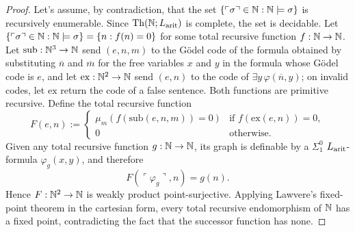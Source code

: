 \begin{proof}
    Let's assume, by contradiction, that the set $\{\ulcorner \sigma \urcorner \in \mathbb{N} : \mathbb{N} \models \sigma\}$ is recursively enumerable. Since $\mathrm{Th}(\mathbb{N};L_{\textnormal{arit}})$ is complete,
    the set is decidable. Let $\{\ulcorner \sigma \urcorner \in \mathbb{N} : \mathbb{N} \models \sigma\} = \{n : f(n) = 0\}$ for some total recursive function $f : \mathbb{N} \to \mathbb{N}$.\newline
    Let $\mathrm{sub} : \mathbb{N}^3 \to \mathbb{N}$ send $(e,n,m)$ to the Gödel code of the formula obtained by substituting $\overline n$ and $\overline m$ for the free variables $x$ and $y$ in the formula whose Gödel code is $e$, and let $\mathrm{ex} : \mathbb{N}^2 \to \mathbb{N}$ send $(e,n)$ to the code of $\exists y\,\varphi(\overline n,y)$; on invalid codes, let $\mathrm{ex}$ return the code of a false sentence. Both functions are primitive recursive.
    Define the total recursive function
    \[ F(e,n) := \begin{cases}\mu_m(f(\mathrm{sub}(e,n,m))=0)&\text{if $f(\mathrm{ex}(e,n))=0$},\\0&\text{otherwise}.\end{cases} \]
    Given any total recursive function $g : \mathbb{N} \to \mathbb{N}$, its graph is definable by a $\Sigma_1^0$ $L_{\textnormal{arit}}$-formula $\varphi_g(x,y)$, and therefore
    \[ F(\ulcorner\varphi_g\urcorner,n)=g(n). \]
    Hence $F : \mathbb{N}^2\to\mathbb{N}$ is weakly product point-surjective. Applying Lawvere's fixed-point theorem in the cartesian form, every total recursive endomorphism of $\mathbb{N}$ has a fixed point, contradicting the fact that the successor function has none.
\end{proof}

